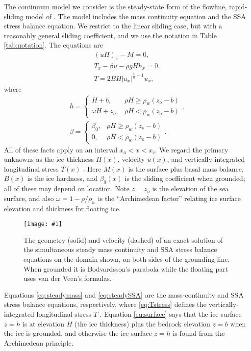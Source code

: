 \documentclass[twocolumn,letterpaper]{igs}
\newcommand{\onecol}[1]{\texttt{[image: \#1]}}
\begin{document}
The continuum model we consider is the steady-state form of the flowline, rapid-sliding model of \citep[equations (2.1)--(2.5)]{SchoofMarine1}.  The model includes the mass continuity equation  and the SSA stress balance equation.  We restrict to the linear sliding case, but with a reasonably general sliding coefficient, and we use the notation in Table \ref{tab:notation}.  The equations are
\begin{gather}
(uH)_x - M = 0, \label{eq:steadymass} \\
T_x - \beta u - \rho g H h_x = 0, \label{eq:steadySSA} \\
T = 2 B H |u_x|^{\frac{1}{n}-1} u_x, \label{eq:Tstress}
\end{gather}
where
\begin{gather}
h = \begin{cases} H+b,            & \rho H \ge \rho_w (z_o - b) \\
                  \omega H + z_o, & \rho H < \rho_w (z_o - b) \end{cases}, \label{eq:surface} \\
\beta = \begin{cases} \beta_0,    & \rho H \ge \rho_w (z_o - b) \\
                      0,          & \rho H < \rho_w (z_o - b) \end{cases}. \label{eq:betafull}
\end{gather}
All of these facts apply on an interval $x_a < x < x_c$.  We regard the primary unknowns as the ice thickness $H(x)$, velocity $u(x)$, and vertically-integrated longitudinal stress $T(x)$ \citep{SchoofMarine1}.  Here $M(x)$ is the surface plus basal mass balance, $B(x)$ is the ice hardness, and $\beta_0(x)$ is the sliding coefficient when grounded; all of these may depend on location.  Note $z=z_o$ is the elevation of the sea surface, and also $\omega = 1 - \rho/\rho_w$ is the ``Archimedean factor'' relating ice surface elevation and thickness for floating ice.


\begin{figure}[ht]
\onecol{exactmarine-geometry}
\caption{The geometry (solid) and velocity (dashed) of an exact solution of the simultaneous steady mass continuity and SSA stress balance equations on the domain shown, on both sides of the grounding line.  When grounded it is Bodvardsson's parabola while the floating part uses van der Veen's formulas.} \label{fig:exactmarine}
\end{figure}


Equations \eqref{eq:steadymass} and \eqref{eq:steadySSA} are the mass-continuity and SSA stress balance equations, respectively, where \eqref{eq:Tstress} defines the vertically-integrated longitudinal stress $T$ \citep{SchoofStream}.  Equation \eqref{eq:surface} says that the ice surface $z=h$ is at elevation $H$ (the ice thickness) plus the bedrock elevation $z=b$ when the ice is grounded, and otherwise the ice surface $z=h$ is found from the Archimedean principle.
\end{document}
